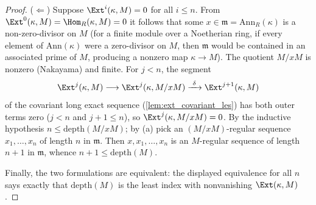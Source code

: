 \begin{proof}
  (\(\Leftarrow\)) Suppose \(\Ext^i(\kappa, M) = 0\) for all \(i \leq n\). From
  \(\Ext^0(\kappa, M) = \Hom_R(\kappa, M) = 0\) it follows that some
  \(x \in \mathfrak m = \mathrm{Ann}_R(\kappa)\) is a non-zero-divisor on \(M\) (for a
  finite module over a Noetherian ring, if every element of \(\mathrm{Ann}(\kappa)\)
  were a zero-divisor on \(M\), then \(\mathfrak m\) would be contained in an associated
  prime of \(M\), producing a nonzero map \(\kappa \to M\)). The quotient \(M/xM\) is
  nonzero (Nakayama) and finite. For \(j < n\), the segment
  \[
    \Ext^{j}(\kappa, M) \longrightarrow \Ext^{j}(\kappa, M/xM)
      \xrightarrow{\ \delta\ } \Ext^{j+1}(\kappa, M)
  \]
  of the covariant long exact sequence (\ref{lem:ext_covariant_les}) has both outer
  terms zero (\(j < n\) and \(j + 1 \leq n\)), so \(\Ext^{j}(\kappa, M/xM) = 0\). By the
  inductive hypothesis \(n \leq \mathrm{depth}(M/xM)\); by (a) pick an
  \((M/xM)\)-regular sequence \(x_1, \dots, x_n\) of length \(n\) in \(\mathfrak m\).
  Then \(x, x_1, \dots, x_n\) is an \(M\)-regular sequence of length \(n+1\) in
  \(\mathfrak m\), whence \(n + 1 \leq \mathrm{depth}(M)\).

  Finally, the two formulations are equivalent: the displayed equivalence for all \(n\)
  says exactly that \(\mathrm{depth}(M)\) is the least index with nonvanishing
  \(\Ext(\kappa, M)\).
\end{proof}

